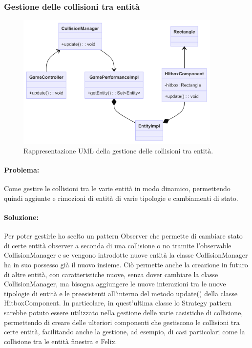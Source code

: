 \documentclass[a4paper,12pt]{report}
\begin{document}
\subsubsection{Gestione delle collisioni tra entità}

\begin{figure}[H]
\centering{}
\includegraphics[width=0.9\textwidth]{img/collisions.png}
\caption{Rappresentazione UML della gestione delle collisioni tra entità.}
\end{figure}

\paragraph{Problema:}
Come gestire le collisioni tra le varie entità in modo dinamico, permettendo quindi aggiunte e rimozioni di entità di varie tipologie e cambiamenti di stato.

\paragraph{Soluzione:}
Per poter gestirle ho scelto un pattern Observer che permette di cambiare stato di certe entità observer a seconda di una collisione o no tramite l'observable CollisionManager e se vengono introdotte nuove entità la classe CollisionManager ha in suo possesso già il nuovo insieme. Ciò permette anche la creazione in futuro di altre entità, con caratteristiche nuove, senza dover cambiare la classe CollisionManager, ma bisogna aggiungere le nuove interazioni tra le nuove tipologie di entità e le preesistenti all'interno del metodo update() della classe HitboxComponent. In particolare, in quest'ultima classe lo Strategy pattern sarebbe potuto essere utilizzato nella gestione delle varie casistiche di collisione, permettendo di creare delle ulteriori componenti che gestiscono le collisioni tra certe entità, facilitando anche la gestione, ad esempio, di casi particolari come la collisione tra le entità finestra e Felix.
\end{document}

